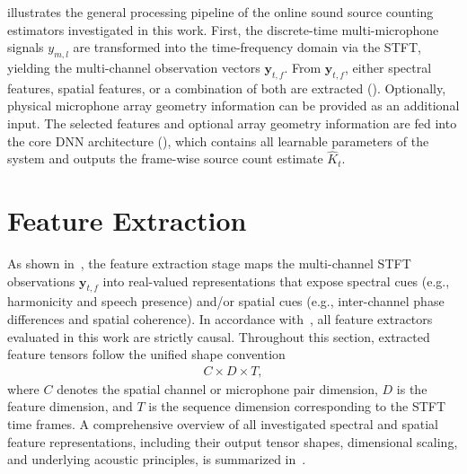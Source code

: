 \documentclass[lettersize,journal]{IEEEtran}
\begin{document}
 illustrates the general processing pipeline of the online sound source counting estimators investigated in this work. First, the discrete-time multi-microphone signals $y_{m,l}$ are transformed into the time-frequency domain via the \gls{STFT}, yielding the multi-channel observation vectors $\mathbf{y}_{t,f}$. From $\mathbf{y}_{t,f}$, either spectral features, spatial features, or a combination of both are extracted (). Optionally, physical microphone array geometry information can be provided as an additional input. The selected features and optional array geometry information are fed into the core \gls{DNN} architecture (), which contains all learnable parameters of the system and outputs the frame-wise source count estimate $\widehat{K}_t$.


\section{Feature Extraction}
\label{sec:feature_extraction}

As shown in~, the feature extraction stage maps the multi-channel \gls{STFT} observations $\mathbf{y}_{t,f}$ into real-valued representations that expose spectral cues (e.g., harmonicity and speech presence) and/or spatial cues (e.g., inter-channel phase differences and spatial coherence). In accordance with~, all feature extractors evaluated in this work are strictly causal. Throughout this section, extracted feature tensors follow the unified shape convention
\begin{align}
  C \times D \times T,
  \label{eq:tensor_shape_convention}
\end{align}
where $C$ denotes the spatial channel or microphone pair dimension, $D$ is the feature dimension, and $T$ is the sequence dimension corresponding to the \gls{STFT} time frames. A comprehensive overview of all investigated spectral and spatial feature representations, including their output tensor shapes, dimensional scaling, and underlying acoustic principles, is summarized in~.
\end{document}

